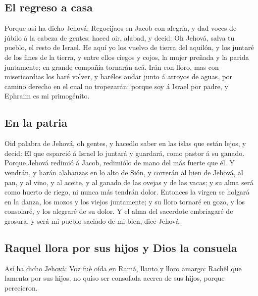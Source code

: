 \hypertarget{el-regreso-a-casa}{%
\subsection{El regreso a casa}\label{el-regreso-a-casa}}

 Porque así ha dicho Jehová: Regocijaos en Jacob con
alegría, y dad voces de júbilo á la cabeza de gentes; haced oir, alabad,
y decid: Oh Jehová, salva tu pueblo, el resto de Israel.  He
aquí yo los vuelvo de tierra del aquilón, y los juntaré de los fines de
la tierra, y entre ellos ciegos y cojos, la mujer preñada y la parida
juntamente; en grande compañía tornarán acá.  Irán con
lloro, mas con misericordias los haré volver, y harélos andar junto á
arroyos de aguas, por camino derecho en el cual no tropezarán: porque
soy á Israel por padre, y Ephraim es mi primogénito.

\hypertarget{en-la-patria}{%
\subsection{En la patria}\label{en-la-patria}}

 Oid palabra de Jehová, oh gentes, y hacedlo saber en las
islas que están lejos, y decid: El que esparció á Israel lo juntará y
guardará, como pastor á su ganado.  Porque Jehová redimió á
Jacob, redimiólo de mano del más fuerte que él.  Y vendrán,
y harán alabanzas en lo alto de Sión, y correrán al bien de Jehová, al
pan, y al vino, y al aceite, y al ganado de las ovejas y de las vacas; y
su alma será como huerto de riego, ni nunca más tendrán dolor.
 Entonces la virgen se holgará en la danza, los mozos y los
viejos juntamente; y su lloro tornaré en gozo, y los consolaré, y los
alegraré de su dolor.  Y el alma del sacerdote embriagaré
de grosura, y será mi pueblo saciado de mi bien, dice Jehová.

\hypertarget{raquel-llora-por-sus-hijos-y-dios-la-consuela}{%
\subsection{Raquel llora por sus hijos y Dios la
consuela}\label{raquel-llora-por-sus-hijos-y-dios-la-consuela}}

 Así ha dicho Jehová: Voz fué oída en Ramá, llanto y lloro
amargo: Rachêl que lamenta por sus hijos, no quiso ser consolada acerca
de sus hijos, porque perecieron.

